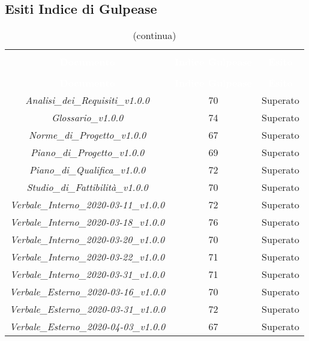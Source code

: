 \subsection{Esiti Indice di Gulpease}
\begin{longtable}{c c c}
\rowcolor{white}\caption{Esiti verifica documenti con Indice di Gulpease} \\
		\rowcolor{redafk}
\textcolor{white}{\textbf{Documento}} &
\textcolor{white}{\textbf{Indice Gulpease}} &
\textcolor{white}{\textbf{Esito}} \\
		\endfirsthead
		\rowcolor{white}\caption[]{(continua)} \\
		\rowcolor{redafk}
\textcolor{white}{\textbf{Documento}} &
\textcolor{white}{\textbf{Indice Gulpease}} &
\textcolor{white}{\textbf{Esito}} \\
		\endhead
		\textit{Analisi\_dei\_Requisiti\_v1.0.0} & 70 & Superato \\
		\textit{Glossario\_v1.0.0} & 74 & Superato \\
		\textit{Norme\_di\_Progetto\_v1.0.0} & 67 & Superato \\
		\textit{Piano\_di\_Progetto\_v1.0.0} & 69 & Superato \\
		\textit{Piano\_di\_Qualifica\_v1.0.0} & 72 & Superato \\
		\textit{Studio\_di\_Fattibilità\_v1.0.0} & 70 & Superato \\
		\textit{Verbale\_Interno\_2020-03-11\_v1.0.0} & 72 & Superato \\
		\textit{Verbale\_Interno\_2020-03-18\_v1.0.0} & 76 & Superato \\
		\textit{Verbale\_Interno\_2020-03-20\_v1.0.0} & 70 & Superato \\
		\textit{Verbale\_Interno\_2020-03-22\_v1.0.0} & 71 & Superato \\
		\textit{Verbale\_Interno\_2020-03-31\_v1.0.0} & 71 & Superato \\
		\textit{Verbale\_Esterno\_2020-03-16\_v1.0.0} & 70 & Superato \\
		\textit{Verbale\_Esterno\_2020-03-31\_v1.0.0} & 72 & Superato \\
		\textit{Verbale\_Esterno\_2020-04-03\_v1.0.0} & 67 & Superato \\
\end{longtable}
